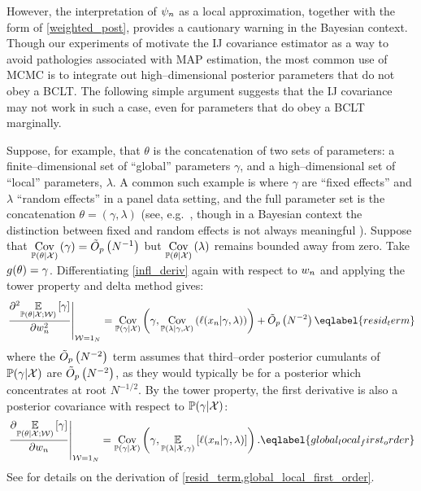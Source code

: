 However, the interpretation of $\psi_n$ as a local approximation, together
with the form of \eqref{weighted_post}, provides a cautionary warning
in the Bayesian context.  Though our experiments of 
motivate the IJ covariance estimator as a way to avoid pathologies associated
with MAP estimation, the most common use of MCMC is to integrate out
high--dimensional posterior parameters that do not obey a BCLT.  The following
simple argument suggests that the IJ covariance may not work in such a case,
even for parameters that do obey a BCLT marginally.

Suppose, for example, that $\theta$ is the concatenation of two sets of
parameters: a finite--dimensional set of ``global'' parameters $\gamma$, and a
high--dimensional set of ``local'' parameters, $\lambda$.  A common such example
is where $\gamma$ are ``fixed effects'' and $\lambda$ ``random effects'' in a
panel data setting, and the full parameter set is the concatenation $\theta =
(\gamma, \lambda)$ (see, e.g.~\citet[Chapter 7]{davidson:2004:econometric},
though in a Bayesian context the distinction between fixed and random effects is
not always meaningful \citep[Chapter 11]{gelman:2006:arm}).  Suppose that
$\underset{\mathbb{P}(\theta | {\mathcal{X}})}{\mathrm{Cov}}\left(\gamma\right) = \tilde{O}_p\left(N^{-1}\right)$ but $\underset{\mathbb{P}(\theta | {\mathcal{X}})}{\mathrm{Cov}}\left(\lambda\right)$ remains
bounded away from zero.  Take $g(\theta) = \gamma$. Differentiating
\eqref{infl_deriv} again with respect to $w_n$ and applying the tower property
and delta method gives:
%
\begin{align}
    \fracat{\partial^2 \expect{\postw}{\gamma}}{\partial \w_n^2}{\wvec = \onevec} =
    \cov{\p(\gamma \vert \xvec)}{
        \gamma,
        \cov{\p(\lambda \vert \gamma, \xvec)}{\ell(\x_n \vert \gamma, \lambda)}
    } + \ordlogp{N^{-2}}
    \eqlabel{resid_term}
\end{align}
%
%
where the $\tilde{O}_p\left(N^{-2}\right)$ term assumes that third--order posterior cumulants
of $\mathbb{P}(\gamma \vert {\mathcal{X}})$ are $\tilde{O}_p\left(N^{-2}\right)$, as they would typically be
for a posterior which concentrates at root $N^{-1/2}$. By the tower property,
the first derivative is also a posterior covariance with respect to  $\mathbb{P}(\gamma
\vert {\mathcal{X}})$:
%
\begin{align}
    \fracat{\partial \expect{\postw}{\gamma}}{\partial \w_n}{\wvec = \onevec} =
    \cov{\p(\gamma \vert \xvec)}{
        \gamma,
        \expect{\p(\lambda \vert \xvec, \gamma)}{\ell(\x_n \vert \gamma, \lambda)}
    }.
    \eqlabel{global_local_first_order}
\end{align}
%
See  for details on the derivation of
\eqref{resid_term,global_local_first_order}.


